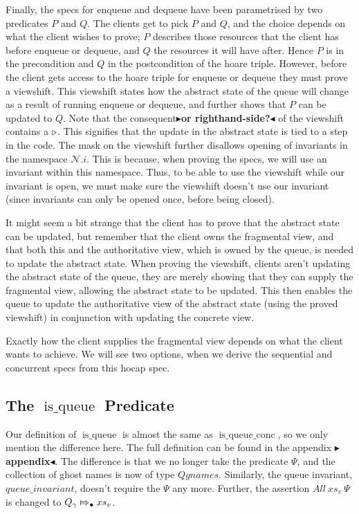 \documentclass[twoside,11pt,openright]{report}
\newcommand{\isqueue}{\operatorname{is\_queue}}
\newcommand{\isqueueconc}{\operatorname{is\_queue\_conc}}
\newcommand{\Qg}{Q_\gname}
\newcommand{\Nl}{\ensuremath{\mathcal{N}}}
\newcommand{\abstractstateauth}[2]{#1 \Mapsto_{\bullet} #2}
\newcommand{\todo}[1]{{\color[rgb]{.5,0,0}\textbf{$\blacktriangleright$#1$\blacktriangleleft$}}}
\begin{document}
Finally, the specs for enqueue and dequeue have been parametrised by two predicates $P$ and $Q$. The clients get to pick $P$ and $Q$, and the choice depends on what the client wishes to prove; $P$ describes those resources that the client has before enqueue or dequeue, and $Q$ the resources it will have after. Hence $P$ is in the precondition and $Q$ in the postcondition of the hoare triple. However, before the client gets access to the hoare triple for enqueue or dequeue they must prove a viewshift. This viewshift states how the abstract state of the queue will change as a result of running enqueue or dequeue, and further shows that $P$ can be updated to $Q$. Note that the consequent\todo{or righthand-side?} of the viewshift contains a $\mathop{\triangleright}$. This signifies that the update in the abstract state is tied to a step in the code. The mask on the viewshift further disallows opening of invariants in the namespace $\Nl.i$. This is because, when proving the specs, we will use an invariant within this namespace. Thus, to be able to use the viewshift while our invariant is open, we must make sure the viewshift doesn't use our invariant (since invariants can only be opened once, before being closed).

It might seem a bit strange that the client has to prove that the abstract state can be updated, but remember that the client owns the fragmental view, and that both this and the authoritative view, which is owned by the queue, is needed to update the abstract state. When proving the viewshift, clients aren't updating the abstract state of the queue, they are merely showing that they can supply the fragmental view, allowing the abstract state to be updated. This then enables the queue to update the authoritative view of the abstract state (using the proved viewshift) in conjunction with updating the concrete view.

Exactly how the client supplies the fragmental view depends on what the client wants to achieve. We will see two options, when we derive the sequential and concurrent specs from this hocap spec.

\subsection[The isqueue predicate]{The $\isqueue$ Predicate}
Our definition of $\isqueue$ is almost the same as $\isqueueconc$, so we only mention the difference here. The full definition can be found in the appendix \todo{appendix}. The difference is that we no longer take the predicate $\Psi$, and the collection of ghost names is now of type $Qgnames$. Similarly, the queue invariant, $queue\_invariant$, doesn't require the $\Psi$ any more. Further, the assertion $All \ xs_v \ \Psi$ is changed to $\abstractstateauth{\Qg}{xs_v}$.
\end{document}
